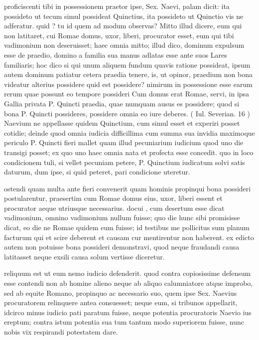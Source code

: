  proficiscenti tibi in possessionem praetor ipse, Sex. Naevi, palam dicit: ita possideto ut tecum simul possideat Quinctius, ita possideto ut Quinctio vis ne adferatur. quid ? tu id quem ad modum observas? Mitto illud dicere, eum qui non latitaret, cui Romae domus, uxor, liberi, procurator esset, eum qui tibi vadimonium non deseruisset; haec omnia mitto; illud dico, dominum expulsum esse de praedio, domino a familia sua manus adlatas esse ante suos Lares familiaris; hoc dico si qui unum aliquem fundum quavis ratione possideat, ipsum autem dominum patiatur cetera praedia tenere, is, ut opinor, praedium non bona videatur alterius possidere quid est possidere? nimirum in possessione esse earum rerum quae possunt eo tempore possideri Cum domus erat Romae, servi, in ipsa Gallia privata P. Quincti praedia, quae numquam ausus es possidere; quod si bona P. Quincti possideres, possidere omnia eo iure deberes. ( Iul. Severian. 16 ) Naevium ne appellasse quidem Quinctium, cum simul esset et experiri posset cotidie; deinde quod omnia iudicia difficillima cum summa sua invidia maximoque periculo P. Quincti fieri mallet quam illud pecuniarium iudicium quod uno die transigi posset; ex quo uno haec omnia nata et profecta esse concedit. quo in loco condicionem tuli, si vellet pecuniam petere, P. Quinctium iudicatum solvi satis daturum, dum ipse, si quid peteret, pari condicione uteretur.

 ostendi quam multa ante fieri convenerit quam hominis propinqui bona possideri postularentur, praesertim cum Romae domus eius, uxor, liberi essent et procurator aeque utriusque necessarius. docui , cum desertum esse dicat vadimonium, omnino vadimonium nullum fuisse; quo die hunc sibi promisisse dicat, eo die ne Romae quidem eum fuisse; id testibus me pollicitus sum planum facturum qui et scire deberent et causam cur mentirentur non haberent. ex edicto autem non potuisse bona possideri demonstravi, quod neque fraudandi causa latitasset neque exsili causa solum vertisse diceretur.

 reliquum est ut eum nemo iudicio defenderit. quod contra copiosissime defensum esse contendi non ab homine alieno neque ab aliquo calumniatore atque improbo, sed ab equite Romano, propinquo ac necessario suo, quem ipse Sex. Naevius procuratorem relinquere antea consuesset; neque eum, si tribunos appellarit, idcirco minus iudicio pati paratum fuisse, neque potentia procuratoris Naevio ius ereptum; contra istum potentia sua tum tantum modo superiorem fuisse, nunc nobis vix respirandi potestatem dare.

